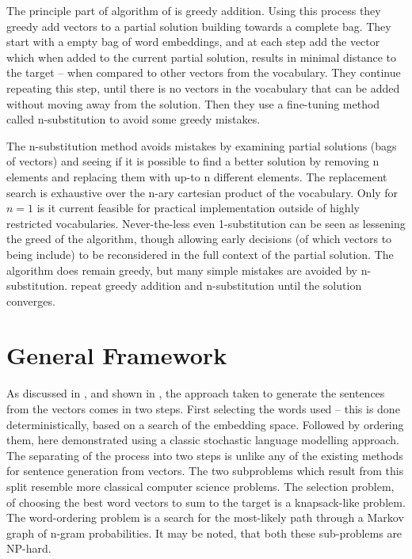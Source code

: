 \documentclass[11pt]{article}
\theoremstyle{plain}
\theoremstyle{definition}
\begin{document}
The principle part of algorithm of \textcite{White2015BOWgen} is greedy addition. Using this process they greedy add vectors to a partial solution building towards a complete bag. They start with a empty bag of word embeddings, and at each step add the vector which when added to the current partial solution, results in minimal distance to the target -- when compared to other vectors from the vocabulary. They continue repeating this step, until there is no vectors in the vocabulary that can be added without moving away from the solution. Then they use a fine-tuning method called n-substitution to avoid some greedy mistakes.

The n-substitution method avoids mistakes by examining partial solutions (bags of vectors) and seeing if it is possible to find a better solution by removing n elements and replacing them with up-to n different elements. The replacement search is exhaustive over the n-ary cartesian product of the vocabulary. Only for $n=1$ is it current feasible for practical implementation outside of highly restricted vocabularies. Never-the-less even 1-substitution can be seen as lessening the greed of the algorithm, though allowing early decisions (of which vectors to being include) to be reconsidered in the full context of the partial solution. The algorithm does remain greedy, but many simple mistakes are avoided by n-substitution. \textcite{White2015BOWgen} repeat greedy addition and n-substitution until the solution converges.




\section{General Framework}\label{framework}
As discussed in , and shown in , the approach taken to generate the sentences from the vectors comes in two steps. First selecting the words used -- this is done deterministically, based on a search of the embedding space. Followed by ordering them, here demonstrated using a classic stochastic language modelling approach. The separating of the process into two steps is unlike any of the existing methods for sentence generation from vectors. The two subproblems which result from this split resemble more classical computer science problems. The selection problem, of choosing the best word vectors to sum to the target is a knapsack-like problem. The word-ordering problem is a search for the most-likely path through a Markov graph of n-gram probabilities. It may be noted, that both these sub-problems are NP-hard.
\end{document}
